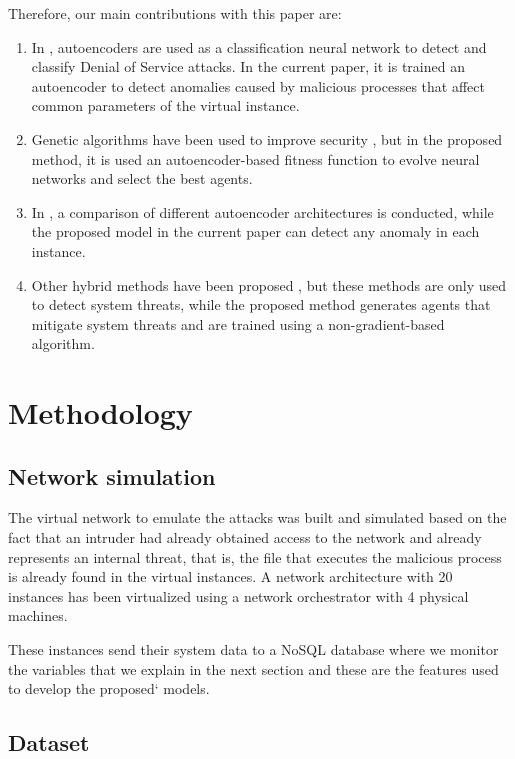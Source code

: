 \documentclass{iosart2c}
\begin{document}
Therefore, our main contributions with this paper are:
\begin{enumerate}
	\item In \cite{autoencoderdos}, autoencoders are used as a classification neural network to detect and classify Denial of Service attacks. In the current paper, it is trained an autoencoder to detect anomalies caused by malicious processes that affect common parameters of the virtual instance. 
	\item Genetic algorithms have been used to improve security \cite{GA1, GA2, GA3}, but in the proposed method, it is used an autoencoder-based fitness function to evolve neural networks and select the best agents.
	\item In \cite{autoencoder3}, a comparison of different autoencoder architectures is conducted, while the proposed model in the current paper can detect any anomaly in each instance.
	\item Other hybrid methods have been proposed \cite{hybrid1, hybrid2}, but these methods are only used to detect system threats, while the proposed method generates agents that mitigate system threats and are trained using a non-gradient-based algorithm.
\end{enumerate}

\section{Methodology}

\subsection{Network simulation}

The virtual network to emulate the attacks was built and simulated based on the fact that an intruder had already obtained access to the network and already represents an internal threat, that is, the file that executes the malicious process is already found in the virtual instances. A network architecture with 20 instances has been virtualized using a network orchestrator with 4 physical machines.

These instances send their system data to a NoSQL database where we monitor the variables that we explain in the next section and these are the features used to develop the proposed` models.

\subsection{Dataset}\label{dataset_autoencoder}
\end{document}
